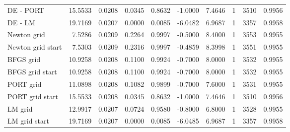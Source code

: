 \begin{tabular}{lrrrrrrrrr}
  DE - PORT & 15.5533 & 0.0208 & 0.0345 & 0.8632 & -1.0000 & 7.4646 & 1 & 3510 & 0.9956 \\ 
  \color{red} DE - LM & \color{red} 19.7169 & \color{red} 0.0207 & \color{red} 0.0000 & \color{red} 0.0085 & \color{red} -6.0482 & \color{red} 6.9687 & \color{red} 1 & \color{red} 3357 & \color{red} 0.9958 \\ 
  Newton grid & 7.5286 & 0.0209 & 0.2264 & 0.9997 & -0.5000 & 8.4000 & 1 & 3553 & 0.9955 \\ 
  Newton grid start & 7.5303 & 0.0209 & 0.2316 & 0.9997 & -0.4859 & 8.3998 & 1 & 3551 & 0.9955 \\ 
  BFGS grid & 10.9258 & 0.0208 & 0.1100 & 0.9924 & -0.7000 & 8.0000 & 1 & 3532 & 0.9955 \\ 
  BFGS grid start & 10.9258 & 0.0208 & 0.1100 & 0.9924 & -0.7000 & 8.0000 & 1 & 3532 & 0.9955 \\ 
  PORT grid & 11.0898 & 0.0208 & 0.1082 & 0.9899 & -0.7000 & 7.6000 & 1 & 3531 & 0.9955 \\ 
  PORT grid start & 15.5533 & 0.0208 & 0.0345 & 0.8632 & -1.0000 & 7.4646 & 1 & 3510 & 0.9956 \\ 
  LM grid & 12.9917 & 0.0207 & 0.0724 & 0.9580 & -0.8000 & 6.8000 & 1 & 3528 & 0.9955 \\ 
  \color{red} LM grid start & \color{red} 19.7169 & \color{red} 0.0207 & \color{red} 0.0000 & \color{red} 0.0085 & \color{red} -6.0485 & \color{red} 6.9687 & \color{red} 1 & \color{red} 3357 & \color{red} 0.9958 \\ 
   \hline
\end{tabular}
